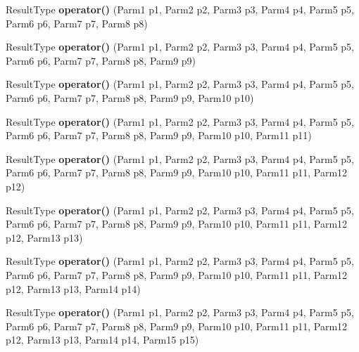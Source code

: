 \begin{DoxyCompactItemize}
\item 
\hypertarget{classLoki_1_1Chainer_aca38299638ca1a6caee1fc67bc5145e8}{}Result\+Type {\bfseries operator()} (Parm1 p1, Parm2 p2, Parm3 p3, Parm4 p4, Parm5 p5, Parm6 p6, Parm7 p7, Parm8 p8)\label{classLoki_1_1Chainer_aca38299638ca1a6caee1fc67bc5145e8}

\item 
\hypertarget{classLoki_1_1Chainer_ac48731bfef52fc486d8c7690d1640021}{}Result\+Type {\bfseries operator()} (Parm1 p1, Parm2 p2, Parm3 p3, Parm4 p4, Parm5 p5, Parm6 p6, Parm7 p7, Parm8 p8, Parm9 p9)\label{classLoki_1_1Chainer_ac48731bfef52fc486d8c7690d1640021}

\item 
\hypertarget{classLoki_1_1Chainer_a2e69109525a58804313992ee47b27bf1}{}Result\+Type {\bfseries operator()} (Parm1 p1, Parm2 p2, Parm3 p3, Parm4 p4, Parm5 p5, Parm6 p6, Parm7 p7, Parm8 p8, Parm9 p9, Parm10 p10)\label{classLoki_1_1Chainer_a2e69109525a58804313992ee47b27bf1}

\item 
\hypertarget{classLoki_1_1Chainer_ae676c50b095422f52b57d3e8e19a29b0}{}Result\+Type {\bfseries operator()} (Parm1 p1, Parm2 p2, Parm3 p3, Parm4 p4, Parm5 p5, Parm6 p6, Parm7 p7, Parm8 p8, Parm9 p9, Parm10 p10, Parm11 p11)\label{classLoki_1_1Chainer_ae676c50b095422f52b57d3e8e19a29b0}

\item 
\hypertarget{classLoki_1_1Chainer_aaf0025afa3050fac91fd11f674169837}{}Result\+Type {\bfseries operator()} (Parm1 p1, Parm2 p2, Parm3 p3, Parm4 p4, Parm5 p5, Parm6 p6, Parm7 p7, Parm8 p8, Parm9 p9, Parm10 p10, Parm11 p11, Parm12 p12)\label{classLoki_1_1Chainer_aaf0025afa3050fac91fd11f674169837}

\item 
\hypertarget{classLoki_1_1Chainer_afff60bf8335c99badaf8a2b265db20d8}{}Result\+Type {\bfseries operator()} (Parm1 p1, Parm2 p2, Parm3 p3, Parm4 p4, Parm5 p5, Parm6 p6, Parm7 p7, Parm8 p8, Parm9 p9, Parm10 p10, Parm11 p11, Parm12 p12, Parm13 p13)\label{classLoki_1_1Chainer_afff60bf8335c99badaf8a2b265db20d8}

\item 
\hypertarget{classLoki_1_1Chainer_acf607f29ae6edb4fc6f272dc6b847a71}{}Result\+Type {\bfseries operator()} (Parm1 p1, Parm2 p2, Parm3 p3, Parm4 p4, Parm5 p5, Parm6 p6, Parm7 p7, Parm8 p8, Parm9 p9, Parm10 p10, Parm11 p11, Parm12 p12, Parm13 p13, Parm14 p14)\label{classLoki_1_1Chainer_acf607f29ae6edb4fc6f272dc6b847a71}

\item 
\hypertarget{classLoki_1_1Chainer_a99e76768e8a682fba5cd7708d3680a22}{}Result\+Type {\bfseries operator()} (Parm1 p1, Parm2 p2, Parm3 p3, Parm4 p4, Parm5 p5, Parm6 p6, Parm7 p7, Parm8 p8, Parm9 p9, Parm10 p10, Parm11 p11, Parm12 p12, Parm13 p13, Parm14 p14, Parm15 p15)\label{classLoki_1_1Chainer_a99e76768e8a682fba5cd7708d3680a22}

\end{DoxyCompactItemize}


